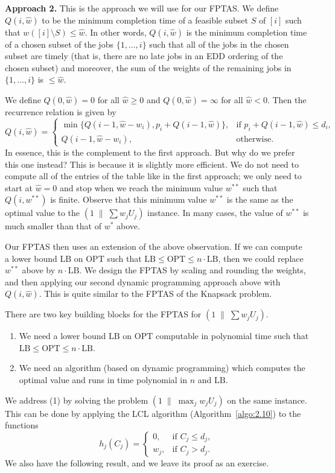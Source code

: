 {\bf Approach 2.} This is the approach we will use for our FPTAS. We define 
$Q(i, \hat w)$ to be the minimum completion time of a feasible subset $S$ 
of $[i]$ such that $w([i] \setminus S) \leq \hat w$. In other words, 
$Q(i, \hat w)$ is the minimum completion time of a chosen subset of the jobs 
$\{1, \dots, i\}$ such that all of the jobs in the chosen subset are timely 
(that is, there are no late jobs in an EDD ordering of the chosen subset)
and moreover, the sum of the weights of the remaining jobs in 
$\{1, \dots, i\}$ is $\leq \hat w$. 

We define $Q(0, \hat w) = 0$ for all $\hat w \geq 0$ and $Q(0, \hat w) 
= \infty$ for all $\hat w < 0$. Then the recurrence relation is given by 
\[ Q(i, \hat w) = \begin{cases}
    \min\{Q(i-1, \hat w - w_i), p_i + Q(i-1, \hat w)\}, & \text{if } 
    p_i + Q(i-1, \hat w) \leq d_i, \\ 
    Q(i-1, \hat w - w_i), & \text{otherwise.}
\end{cases} \]
In essence, this is the complement to the first approach. But why do we 
prefer this one instead? This is because it is slightly more efficient. 
We do not need to compute all of the entries of the table like in the 
first approach; we only need to start at $\hat w = 0$ and stop when 
we reach the minimum value $w^{**}$ such that $Q(i, w^{**})$ is finite. 
Observe that this minimum value $w^{**}$ is the same as the optimal value 
to the $(1\;\|\;\sum w_j U_j)$ instance. In many cases, the value of 
$w^{**}$ is much smaller than that of $w^*$ above. 

Our FPTAS then uses an extension of the above observation. If we can compute a 
lower bound $\text{LB}$ on $\text{OPT}$ such that $\text{LB} \leq 
\text{OPT} \leq n \cdot \text{LB}$, then we could replace $w^{**}$ above 
by $n \cdot \text{LB}$. We design the FPTAS by scaling and rounding the 
weights, and then applying our second dynamic programming approach above
with $Q(i, \hat w)$. This is quite similar to the FPTAS of the {\sc Knapsack} 
problem. 

There are two key building blocks for the FPTAS for $(1\;\|\;\sum w_j U_j)$. 
\begin{enumerate}[(1)]
    \item We need a lower bound $\text{LB}$ on $\text{OPT}$ computable in 
    polynomial time such that $\text{LB} \leq \text{OPT} \leq n \cdot \text{LB}$.
    \item We need an algorithm (based on dynamic programming) which computes 
    the optimal value and runs in time  polynomial in $n$ and $\text{LB}$. 
\end{enumerate}
We address (1) by solving the problem $(1\;\|\;\max_j w_jU_j)$ on the 
same instance. This can be done by applying the LCL algorithm 
(Algorithm~\ref{algo:2.10}) to the functions 
\[ h_j(C_j) = \begin{cases} 
    0, & \text{if } C_j \leq d_j, \\ 
    w_j, & \text{if } C_j > d_j. 
\end{cases} \] 
We also have the following result, and we leave its proof as an exercise. 

